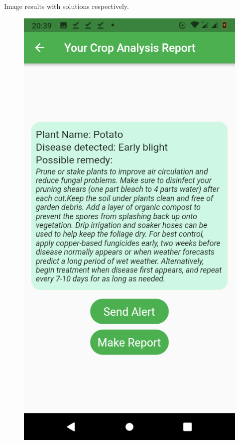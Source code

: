 \documentclass[11pt]{report}
\begin{document}
\newpage
Image results with solutions respectively.\\
\begin{figure}[h]
	\centerline{\small 
		\includegraphics[height=0.25\textheight]  {r2}}
\end{figure}
\end{document}

